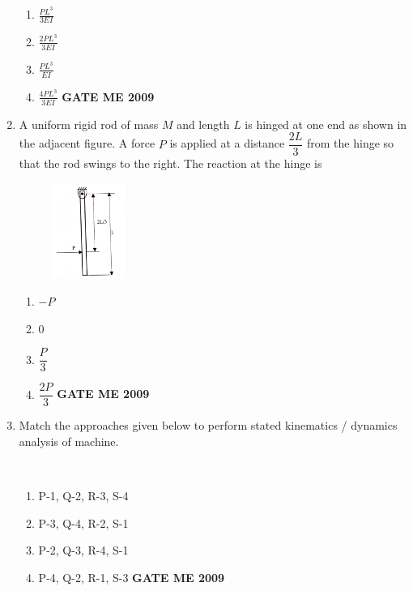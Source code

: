 \documentclass[journal]{IEEEtran}
\begin{document}
\begin{enumerate}[leftmargin=0pt]
\begin{enumerate}[label=(\Alph*)]
  \item $\frac{PL^3}{3EI}$
  \item $\frac{2PL^3}{3EI}$
  \item $\frac{PL^3}{EI}$
  \item $\frac{4PL^3}{3EI}$
\hfill{\textbf{GATE ME 2009}}
\end{enumerate}





\item A uniform rigid rod of mass $M$ and length $L$ is hinged at one end as shown in the adjacent figure. A force $P$ is applied at a distance $\dfrac{2L}{3}$ from the hinge so that the rod swings to the right. The reaction at the hinge is
\begin{figure}[h]
  \centering
  \includegraphics[width=0.23\textwidth]{Figs/image (10).png}
\end{figure}
\begin{enumerate}[label=(\Alph*)]
  \item $-P$
  \item $0$
  \item $\dfrac{P}{3}$
  \item $\dfrac{2P}{3}$
\hfill{\textbf{GATE ME 2009}}
\end{enumerate}
\item Match the approaches given below to perform stated kinematics / dynamics analysis of machine.\\
\begin{table}[h]
    \centering
    
\end{table}\\

\begin{enumerate}[label=(\Alph*)]
  \item P-1, Q-2, R-3, S-4
  \item P-3, Q-4, R-2, S-1
  \item P-2, Q-3, R-4, S-1
  \item P-4, Q-2, R-1, S-3
\hfill{\textbf{GATE ME 2009}}
\end{enumerate}


\end{enumerate}
\end{document}
